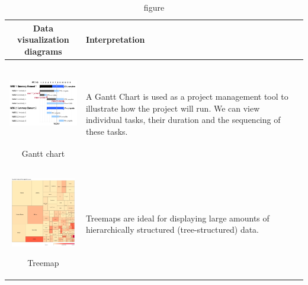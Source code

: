 \begin{table}[H]
\label{table2}
  \centering
  \begin{adjustbox}{max width=\textwidth}
  \begin{tabular}{ | c | m{3cm} | m{3cm} | }
    \hline
    Data visualization diagrams & Interpretation \\ \hline
    \begin{minipage}{.3\textwidth}
      \includegraphics[width=30mm, height=30mm]{images/GanttChart.png}
      \caption*{figure}{Gantt chart}
    \end{minipage}
    &
      A Gantt Chart is used as a project management tool to illustrate how the project will run. We can view individual tasks, their duration and the sequencing of these tasks.
    
    \\ \hline
    
    \hline
  
    \begin{minipage}{.3\textwidth}
      \includegraphics[width=30mm, height=30mm]{images/Treemap.png}
      \caption*{figure}{Treemap}
    \end{minipage}
    &
      Treemaps are ideal for displaying large amounts of hierarchically structured (tree-structured) data.
    
    \\ \hline
    
   \hline
  

\end{tabular}
\end{adjustbox}
\end{table}
